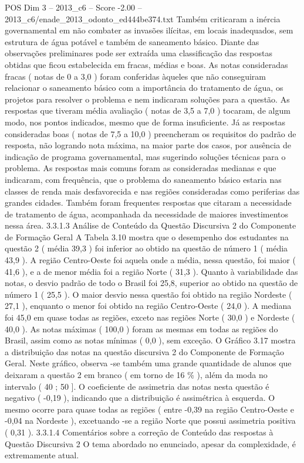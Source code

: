 \begin{textsample}{POS Dim 3 – 2013\_c6 – Score -2.00 – 2013\_c6/enade\_2013\_odonto\_ed444be374.txt}
Também criticaram a inércia governamental em não combater as invasões ilícitas, em locais inadequados, sem estrutura de água potável e também de saneamento básico.
Diante das observações preliminares pode ser extraída uma classificação das respostas obtidas que ficou estabelecida em fracas, médias e boas.
As notas consideradas fracas ( notas de 0 a 3,0 ) foram conferidas àqueles que não conseguiram relacionar o saneamento básico com a importância do tratamento de água, os projetos para resolver o problema e nem indicaram soluções para a questão.
As respostas que tiveram média avaliação ( notas de 3,5 a 7,0 ) tocaram, de algum modo, nos pontos indicados, mesmo que de forma insuficiente.
Já as respostas consideradas boas ( notas de 7,5 a 10,0 ) preencheram os requisitos do padrão de resposta, não logrando nota máxima, na maior parte dos casos, por ausência de indicação de programa governamental, mas sugerindo soluções técnicas para o problema.
As respostas mais comuns foram as consideradas medianas e que indicaram, com frequência, que o problema do saneamento básico estaria nas classes de renda mais desfavorecida e nas regiões consideradas como periferias das grandes cidades.
Também foram frequentes respostas que citaram a necessidade de tratamento de água, acompanhada da necessidade de maiores investimentos nessa área. 3.3.1.3 Análise de Conteúdo da Questão Discursiva 2 do Componente de Formação Geral A Tabela 3.10 mostra que o desempenho dos estudantes na questão 2 ( média 39,3 ) foi inferior ao obtido na questão de número 1 ( média 43,9 ).
A região Centro-Oeste foi aquela onde a média, nessa questão, foi maior ( 41,6 ), e a de menor média foi a região Norte ( 31,3 ).
Quanto à variabilidade das notas, o desvio padrão de todo o Brasil foi 25,8, superior ao obtido na questão de número 1 ( 25,5 ).
O maior desvio nessa questão foi obtido na região Nordeste ( 27,1 ), enquanto o menor foi obtido na região Centro-Oeste ( 24,0 ).
A mediana foi 45,0 em quase todas as regiões, exceto nas regiões Norte ( 30,0 ) e Nordeste ( 40,0 ).
As notas máximas ( 100,0 ) foram as mesmas em todas as regiões do Brasil, assim como as notas mínimas ( 0,0 ), sem exceção.
O Gráfico 3.17 mostra a distribuição das notas na questão discursiva 2 do Componente de Formação Geral.
Neste gráfico, observa -se também uma grande quantidade de alunos que deixaram a questão 2 em branco ( em torno de 16 \% ), além da moda no intervalo ( 40 ; 50 ].
O coeficiente de assimetria das notas nesta questão é negativo ( -0,19 ), indicando que a distribuição é assimétrica à esquerda.
O mesmo ocorre para quase todas as regiões ( entre -0,39 na região Centro-Oeste e -0,04 na Nordeste ), excetuando -se a região Norte que possui assimetria positiva ( 0,31 ). 3.3.1.4 Comentários sobre a correção de Conteúdo das respostas à Questão Discursiva 2 O tema abordado no enunciado, apesar da complexidade, é extremamente atual.

\end{textsample}
